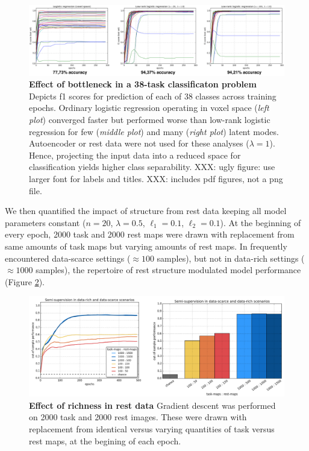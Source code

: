 \documentclass{article} %
\begin{document}
\begin{figure}
\begin{centering}
\includegraphics[width=1.00\textwidth]{figures/accuracies.png}
\end{centering}
\vspace{-0.5cm}
\caption{\textbf{Effect of bottleneck in a 38-task classificaton problem}
Depicts f1 scores for prediction of each of 38 classes across training epochs.
Ordinary logistic regression operating in voxel space (\textit{left plot})
converged faster but performed worse than
low-rank logistic regression for few
(\textit{middle plot}) and many (\textit{right plot}) latent modes.
Autoencoder or rest data were not used for these analyses
($\lambda=1$).
Hence, projecting the input data into a reduced space for classification
yields higher class separability.
XXX: ugly figure: use larger font for labels and titles.
XXX: includes pdf figures, not a png file.
}
\label{fig_dimred}
\end{figure}

We then quantified the impact of structure from rest data keeping
all model parameters constant
($n=20$, $\lambda=0.5$, $\ell_1=0.1$, $\ell_2=0.1$).
At the beginning of every epoch,
2000 task and 2000 rest maps were drawn with replacement
from same amounts of task maps but varying amounts of rest maps.
In frequently encountered data-scarce settings ($\approx{100}$ samples),
but not in data-rich settings ($\approx{1000}$ samples),
the repertoire of rest structure modulated model performance
(Figure \ref{fig_semisup}).

\begin{figure}
\begin{centering}
\includegraphics[width=1.00\textwidth]{figures/semisup_both.png}
\end{centering}
\vspace{-0.5cm}
\caption{\textbf{Effect of richness in rest data}
Gradient descent was performed on 2000 task and 2000 rest images.
These were drawn with replacement from identical versus varying
quantities of task versus rest maps, at the begining of each epoch.
}
\label{fig_semisup}
\end{figure}
\end{document}
